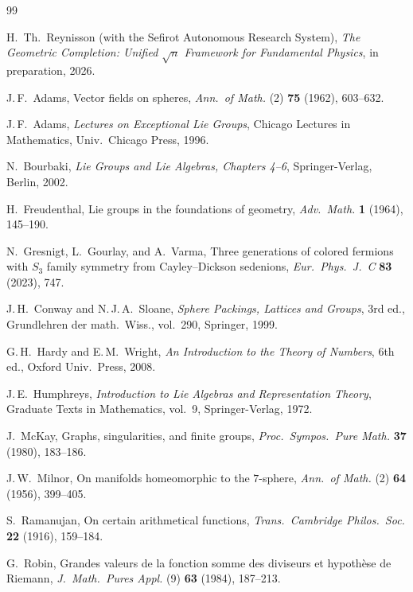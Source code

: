 \documentclass[11pt]{amsart}
\theoremstyle{plain}
\theoremstyle{definition}
\theoremstyle{remark}
\begin{document}
\begin{thebibliography}{99}

H.~Th.\ Reynisson (with the Sefirot Autonomous Research System),
\emph{The Geometric Completion: Unified $\sqrt{n}$ Framework for Fundamental Physics},
in preparation, 2026.

J.\,F.~Adams,
Vector fields on spheres,
\emph{Ann.\ of Math.} (2) \textbf{75} (1962), 603--632.

J.\,F.~Adams,
\emph{Lectures on Exceptional Lie Groups},
Chicago Lectures in Mathematics, Univ.\ Chicago Press, 1996.

N.~Bourbaki,
\emph{Lie Groups and Lie Algebras, Chapters 4--6},
Springer-Verlag, Berlin, 2002.

H.~Freudenthal,
Lie groups in the foundations of geometry,
\emph{Adv.\ Math.} \textbf{1} (1964), 145--190.

N.~Gresnigt, L.~Gourlay, and A.~Varma,
Three generations of colored fermions with $S_3$ family symmetry
from Cayley--Dickson sedenions,
\emph{Eur.\ Phys.\ J.\ C} \textbf{83} (2023), 747.

J.\,H.~Conway and N.\,J.\,A.~Sloane,
\emph{Sphere Packings, Lattices and Groups},
3rd ed., Grundlehren der math.\ Wiss., vol.~290, Springer, 1999.

G.\,H.~Hardy and E.\,M.~Wright,
\emph{An Introduction to the Theory of Numbers},
6th ed., Oxford Univ.\ Press, 2008.

J.\,E.~Humphreys,
\emph{Introduction to Lie Algebras and Representation Theory},
Graduate Texts in Mathematics, vol.~9, Springer-Verlag, 1972.

J.~McKay,
Graphs, singularities, and finite groups,
\emph{Proc.\ Sympos.\ Pure Math.} \textbf{37} (1980), 183--186.

J.\,W.~Milnor,
On manifolds homeomorphic to the $7$-sphere,
\emph{Ann.\ of Math.} (2) \textbf{64} (1956), 399--405.

S.~Ramanujan,
On certain arithmetical functions,
\emph{Trans.\ Cambridge Philos.\ Soc.} \textbf{22} (1916), 159--184.

G.~Robin,
Grandes valeurs de la fonction somme des diviseurs et
hypoth\`ese de Riemann,
\emph{J.\ Math.\ Pures Appl.} (9) \textbf{63} (1984), 187--213.


\end{thebibliography}
\end{document}
